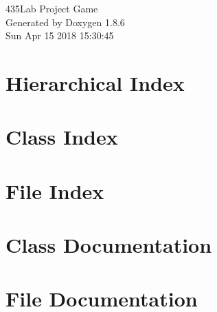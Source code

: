 \documentclass[twoside]{book}
\newcommand{\clearemptydoublepage}{%
  \newpage{\pagestyle{empty}\cleardoublepage}%
}
\begin{document}
\hypersetup{pageanchor=false}
\begin{titlepage}
\vspace*{7cm}
\begin{center}%
{\Large 435\-Lab Project Game }\\
\vspace*{1cm}
{\large Generated by Doxygen 1.8.6}\\
\vspace*{0.5cm}
{\small Sun Apr 15 2018 15:30:45}\\
\end{center}
\end{titlepage}
\clearemptydoublepage
\tableofcontents
\clearemptydoublepage
{}
\hypersetup{pageanchor=true}

\chapter{Hierarchical Index}

\chapter{Class Index}

\chapter{File Index}

\chapter{Class Documentation}































\chapter{File Documentation}


























\newpage
{}
{}
\printindex
\end{document}
